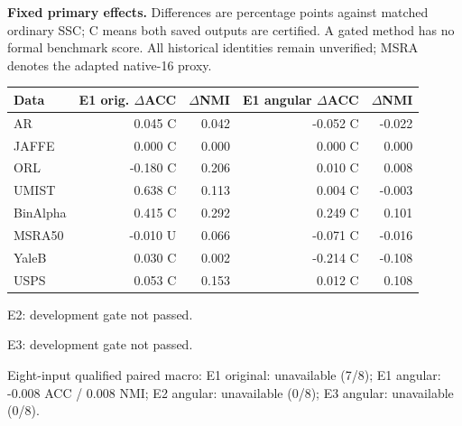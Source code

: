 \noindent\textbf{Fixed primary effects.} Differences are percentage points against matched ordinary SSC; C means both saved outputs are certified. A gated method has no formal benchmark score. All historical identities remain unverified; MSRA denotes the adapted native-16 proxy.
\begin{center}\small\begin{tabular}{lrrrr}\toprule
Data & E1 orig. $\Delta$ACC & $\Delta$NMI & E1 angular $\Delta$ACC & $\Delta$NMI\\\midrule
AR & 0.045 C & 0.042 & -0.052 C & -0.022\\
JAFFE & 0.000 C & 0.000 & 0.000 C & 0.000\\
ORL & -0.180 C & 0.206 & 0.010 C & 0.008\\
UMIST & 0.638 C & 0.113 & 0.004 C & -0.003\\
BinAlpha & 0.415 C & 0.292 & 0.249 C & 0.101\\
MSRA50 & -0.010 U & 0.066 & -0.071 C & -0.016\\
YaleB & 0.030 C & 0.002 & -0.214 C & -0.108\\
USPS & 0.053 C & 0.153 & 0.012 C & 0.108\\
\bottomrule\end{tabular}\end{center}
\noindent E2: development gate not passed.\par
\noindent E3: development gate not passed.\par
\noindent Eight-input qualified paired macro: E1 original: unavailable (7/8); E1 angular: -0.008 ACC / 0.008 NMI; E2 angular: unavailable (0/8); E3 angular: unavailable (0/8).\par
